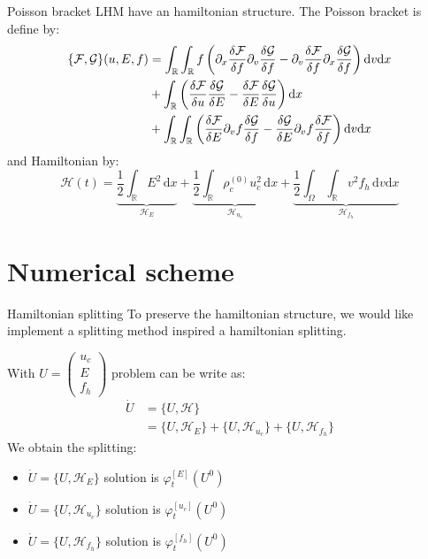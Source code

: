 \documentclass{beamer}
\newcommand{\arrow}{{\color{PLB}\ding{220}}}
\begin{document}
\begin{frame}{Poisson bracket}
  LHM have an hamiltonian structure. The Poisson bracket is define by:
  $$
    \begin{aligned}
      \{ {\cal F}, {\cal G} \}( u, E, f) &= \int_{\mathbb{R}}\int_{\mathbb{R}} f \left( \partial_x \frac{\delta {\cal F}}{\delta f}\partial_{v} \frac{\delta {\cal G}}{\delta f} - \partial_{v} \frac{\delta {\cal F}}{\delta f}\partial_{x} \frac{\delta {\cal G}}{\delta f}\right)\mathrm{d}v \mathrm{d}x \\
                           & + \int_{\mathbb{R}}  \left(  \frac{\delta {\cal F}}{\delta{ u}}  \frac{\delta {\cal G}}{\delta{ E}} - \frac{\delta {\cal F}}{\delta{ E}}  \frac{\delta {\cal G}}{\delta{u}} \right) \mathrm{d}x \\
                           & + \int_{\mathbb{R}}\int_{\mathbb{R}}  \left(  \frac{\delta {\cal F}}{\delta{ E}}  \partial_v f\frac{\delta {\cal G}}{\delta{ f}} - \frac{\delta {\cal G}}{\delta{ E}} \partial_v f \frac{\delta {\cal F}}{\delta{f}} \right) \mathrm{d}{ v}\mathrm{d}x \\
    \end{aligned}
  $$
  and Hamiltonian by:
  $$
    \mathcal{H}(t) = \underbrace{\frac{1}{2}\int_\mathbb{R}E^2\,\mathrm{d}x}_{\mathcal{H}_{E}}
                   + \underbrace{\frac{1}{2}\int_\mathbb{R}\rho_c^{(0)}u_c^2\,\mathrm{d}x}_{\mathcal{H}_{u_c}}
                   + \underbrace{\frac{1}{2}\int_\Omega\int_\mathbb{R}v^2f_h\,\mathrm{d}v\mathrm{d}x}_{\mathcal{H}_{f_h}}
  $$
\end{frame}

\section{Numerical scheme}

\begin{frame}{Hamiltonian splitting}
  To preserve the hamiltonian structure, we would like implement a splitting method inspired a hamiltonian splitting.

  With $U=\begin{pmatrix}u_c\\E\\f_h\end{pmatrix}$ problem can be write as:
  $$
    \begin{aligned}
      \dot{U} &= \{U,\mathcal{H}\} \\
              &= \{U,\mathcal{H}_{E}\} + \{U,\mathcal{H}_{u_c}\} + \{U,\mathcal{H}_{f_h}\}
    \end{aligned}
  $$
  We obtain the splitting:
  \begin{itemize}
    \item $\dot{U} = \{U,\mathcal{H}_{E}\}$   \hfill \arrow \hfill solution is $\varphi^{[E]}_t(U^0)$
    \item $\dot{U} = \{U,\mathcal{H}_{u_c}\}$ \hfill \arrow \hfill solution is $\varphi^{[u_c]}_t(U^0)$
    \item $\dot{U} = \{U,\mathcal{H}_{f_h}\}$ \hfill \arrow \hfill solution is $\varphi^{[f_h]}_t(U^0)$
  \end{itemize}
\end{frame}
\end{document}
